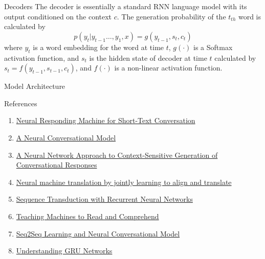 \begin{frame}{Decoders}
The decoder is essentially a standard RNN language model with its output conditioned on the context $c$. The generation probability of the $t_{th}$ word is calculated by
\begin{equation*}
p(y_t | y_{t-1}\ldots,y_1,x) = g(y_{t-1},s_t,c_t)
\end{equation*}
where $y_t$ is a word embedding for the word at time $t$, $g(\cdot)$ is a Softmax activation function, and $s_t$ is the hidden state of decoder at time $t$ calculated by
$s_t = f(y_{t-1},s_{t-1},c_t)$, and $f(\cdot)$ is a non-linear activation function.
\end{frame}

\begin{frame}{Model Architecture}

\end{frame}
\begin{frame}{References}
\begin{enumerate}
\item \href{https://arxiv.org/pdf/1503.02364.pdf}{Neural Responding Machine for Short-Text Conversation}
\item \href{https://arxiv.org/pdf/1506.05869.pdf}{A Neural Conversational Model}
\item \href{https://arxiv.org/pdf/1506.06714.pdf}{A Neural Network Approach to
Context-Sensitive Generation of Conversational Responses}
\item \href{https://arxiv.org/pdf/1409.0473.pdf}{Neural machine translation
by jointly learning to align and translate}
\item \href{https://arxiv.org/pdf/1211.3711.pdf}{Sequence Transduction with Recurrent Neural Networks}
\item \href{https://arxiv.org/pdf/1506.03340.pdf}{Teaching Machines to Read and Comprehend}
\item \href{https://isaacchanghau.github.io/post/seq2seq_conversation/}{Seq2Seq Learning and Neural Conversational Model}
\item \href{https://towardsdatascience.com/understanding-gru-networks-2ef37df6c9be}{Understanding GRU Networks}
\end{enumerate}
\end{frame}
